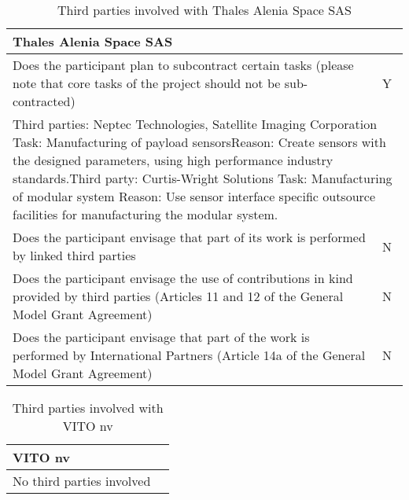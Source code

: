 \begin{table}[H]
	\centering
	\begin{tabular}{|p{10cm}|p{4cm}|}
		\hline
		
		\multicolumn{2}{|p{14cm}|}{\textbf{Thales Alenia Space SAS}}\\
		
		\hline
		
		Does the participant plan to subcontract certain tasks (please note that core tasks of the project should not be sub-contracted) & Y\\
		
		\hline
		
		\multicolumn{2}{|p{14cm}|}{Third parties: Neptec Technologies, Satellite Imaging Corporation \newline Task: Manufacturing of payload sensors\newline Reason: Create sensors with the designed parameters, using high performance industry standards.\vspace{0.2cm}\newline Third party: Curtis-Wright Solutions \newline Task: Manufacturing of modular system \newline Reason: Use sensor interface specific outsource facilities for manufacturing the modular system.}\\
		
		\hline
		
		Does the participant envisage that part of its work is performed by linked third parties & N\\
		
		\hline
		
		Does the participant envisage the use of contributions in kind provided by third parties (Articles 11 and 12 of the General Model Grant Agreement) & N\\
		
		\hline
		
		Does the participant envisage that part of the work is performed by International Partners (Article 14a of the General Model Grant Agreement) & N\\
		
		\hline
		
	\end{tabular}
	\caption{Third parties involved with Thales Alenia Space SAS}
\end{table}



\begin{table}[H]
	\centering
	\begin{tabular}{|p{10cm} p{4cm}|}
		\hline
		
		\multicolumn{2}{|p{14cm}|}{\textbf{VITO nv}}\\
		
		\hline
		
		No third parties involved & \\
		
		\hline
	\end{tabular}
	\caption{Third parties involved with VITO nv}
\end{table}